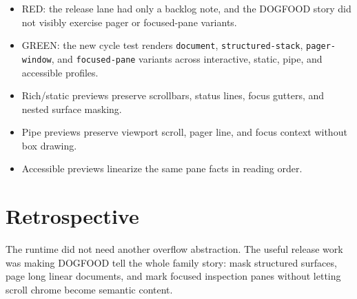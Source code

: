 \begin{itemize}
\tightlist
\item
  RED: the release lane had only a backlog note, and the DOGFOOD story did not visibly exercise pager or focused-pane variants.
\item
  GREEN: the new cycle test renders \texttt{d\allowbreak{}o\allowbreak{}c\allowbreak{}u\allowbreak{}m\allowbreak{}e\allowbreak{}n\allowbreak{}t}, \texttt{s\allowbreak{}t\allowbreak{}r\allowbreak{}u\allowbreak{}c\allowbreak{}t\allowbreak{}u\allowbreak{}r\allowbreak{}e\allowbreak{}d\allowbreak{}-\allowbreak{}s\allowbreak{}t\allowbreak{}a\allowbreak{}c\allowbreak{}k}, \texttt{p\allowbreak{}a\allowbreak{}g\allowbreak{}e\allowbreak{}r\allowbreak{}-\allowbreak{}w\allowbreak{}i\allowbreak{}n\allowbreak{}d\allowbreak{}o\allowbreak{}w}, and \texttt{f\allowbreak{}o\allowbreak{}c\allowbreak{}u\allowbreak{}s\allowbreak{}e\allowbreak{}d\allowbreak{}-\allowbreak{}p\allowbreak{}a\allowbreak{}n\allowbreak{}e} variants across interactive, static, pipe, and accessible profiles.
\item
  Rich/static previews preserve scrollbars, status lines, focus gutters, and nested surface masking.
\item
  Pipe previews preserve viewport scroll, pager line, and focus context without box drawing.
\item
  Accessible previews linearize the same pane facts in reading order.
\end{itemize}

\section{Retrospective}\label{record-100-retrospective}

The runtime did not need another overflow abstraction. The useful release work was making DOGFOOD tell the whole family story: mask structured surfaces, page long linear documents, and mark focused inspection panes without letting scroll chrome become semantic content.

